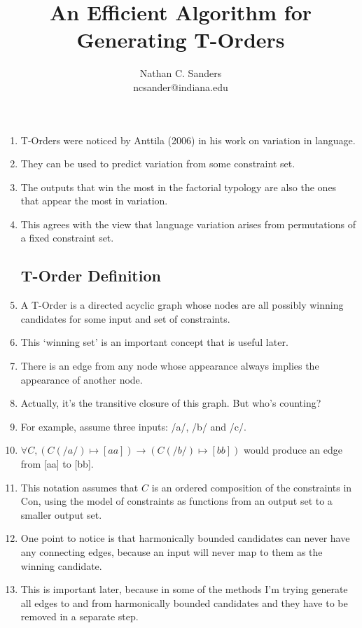 \documentclass[11pt]{article}
\author{Nathan C. Sanders \\ ncsander@indiana.edu}
\title{An Efficient Algorithm for Generating T-Orders}
\begin{document}
\maketitle
\begin{enumerate}
  \section{T-Orders}
\item T-Orders were noticed by Anttila (2006) in his work on variation
  in language.

\item
  They can be used to predict variation from some constraint set.
\item The outputs that win the most in the factorial typology are also the ones that
  appear the most in variation.
\item This agrees with the view that language variation arises from permutations
  of a fixed constraint set.
\subsection{T-Order Definition}
\item A T-Order is a directed acyclic graph whose nodes are all possibly winning
  candidates for some input and set of constraints.
\item This `winning set' is an important concept that is useful later.
\item There is an edge from any node whose appearance always implies the
  appearance of another node.
\item Actually, it's the transitive closure of this graph. But who's counting?
\item For example, assume three inputs: /a/, /b/ and /c/.
\item $\forall C , (C(/a/) \mapsto [aa]) \to (C(/b/) \mapsto [bb])$ would
  produce an edge from [aa] to [bb].
\item This notation assumes that $C$ is an ordered composition of
  the constraints in {\sc Con}, using the model of constraints as functions from
  an output set to a smaller output set.
\item One point to notice is that harmonically bounded candidates can never have
  any connecting edges, because an input will never map to them as the winning
  candidate.
\item This is important later, because in some of the methods I'm trying generate
  all edges to and from harmonically bounded candidates and they have to be
  removed in a separate step.

\end{enumerate}
\end{document}
